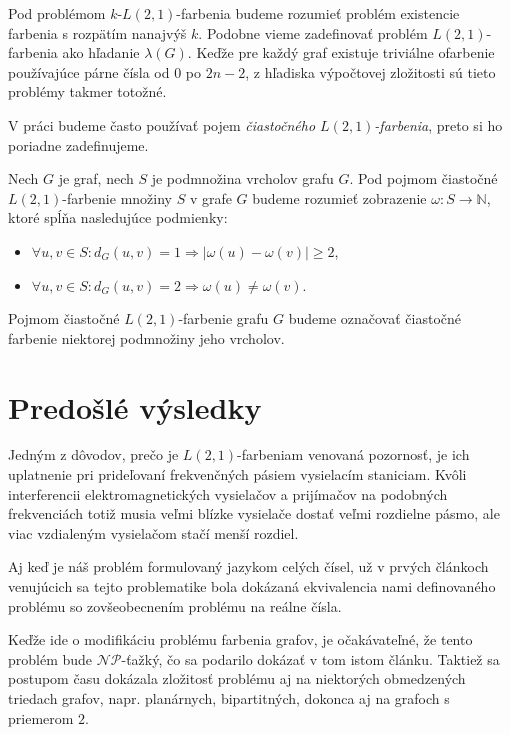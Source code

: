 Pod problémom $k$-$L(2,1)$-farbenia budeme rozumieť problém existencie farbenia
s rozpätím nanajvýš $k$. Podobne vieme zadefinovať problém $L(2,1)$-farbenia ako
hľadanie $\lambda(G)$. Keďže pre každý graf existuje triviálne ofarbenie
používajúce párne čísla od $0$ po $2n - 2$, z hľadiska výpočtovej zložitosti
sú tieto problémy takmer totožné.

V práci budeme často používať pojem \emph{čiastočného $L(2,1)$-farbenia}, preto
si ho poriadne zadefinujeme.

\begin{defn}
    Nech $G$ je graf, nech $S$ je podmnožina vrcholov grafu $G$. Pod pojmom
    čiastočné $L(2,1)$-farbenie množiny $S$ v grafe $G$ budeme rozumieť zobrazenie
    $\omega : S \to \mathbb{N}$, ktoré spĺňa nasledujúce podmienky:

    \begin{itemize}
        \item $\forall u, v \in S: d_G(u,v) = 1 \Rightarrow \left| \omega(u) - \omega(v) \right| \ge 2$,
        \item $\forall u, v \in S: d_G(u,v) = 2 \Rightarrow \omega(u) \neq \omega(v)$.
    \end{itemize}

    Pojmom čiastočné $L(2,1)$-farbenie grafu $G$ budeme označovať čiastočné farbenie
    niektorej podmnožiny jeho vrcholov.
\end{defn}

\section{Predošlé výsledky}

Jedným z dôvodov, prečo je $L(2,1)$-farbeniam venovaná pozornosť, je ich uplatnenie
pri prideľovaní frekvenčných pásiem vysielacím staniciam. Kvôli interferencii
elektromagnetických vysielačov a prijímačov na podobných frekvenciách totiž
musia veľmi blízke vysielače dostať veľmi rozdielne pásmo, ale viac vzdialeným
vysielačom stačí menší rozdiel.

Aj keď je náš problém formulovaný jazykom celých čísel, už v prvých článkoch
venujúcich sa tejto problematike bola dokázaná ekvivalencia
nami definovaného problému so zovšeobecnením problému na reálne čísla\cite{griggs_yeh_tree}.

Keďže ide o modifikáciu problému farbenia grafov, je očakávateľné, že tento
problém bude $\mathcal{NP}$-ťažký, čo sa podarilo dokázať v tom istom článku.
Taktiež sa postupom času dokázala zložitosť problému aj na niektorých obmedzených
triedach grafov, napr. planárnych, bipartitných, dokonca aj na grafoch s
priemerom $2$\cite{color_survey}.

